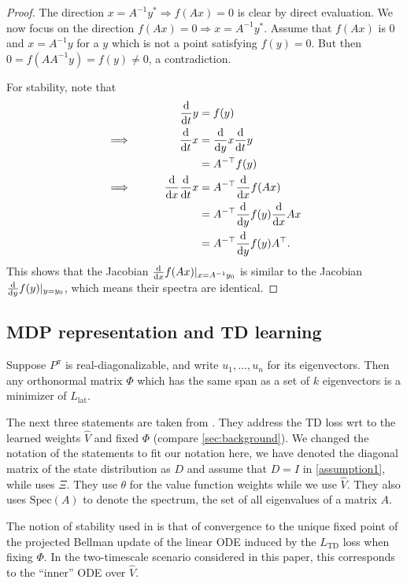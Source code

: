 \begin{proof}
The direction $x = A^{-1}y^* \Rightarrow f(Ax) = 0$ is clear by direct evaluation. We now focus on the direction $f(Ax) = 0 \Rightarrow x = A^{-1}y^*$. Assume that $f(Ax)$ is $0$ and $x = A^{-1}y$ for a $y$ which is not a point satisfying $f(y)=0$. But then $0 = f(AA^{-1}y) = f(y) \neq 0$, a contradiction.

For stability, note that
\begin{alignat*}{2}
    &\qquad&\frac{\mathrm{d}}{\mathrm{d} t} y & = f(y) \\
    \implies&&\frac{\mathrm{d}}{\mathrm{d} t} x & = \frac{\mathrm{d}}{\mathrm{d} y} x \frac{\mathrm{d}}{\mathrm{d} t} y\\
    && &= A^{-\top} f(y)\\
    \implies&& \frac{\mathrm{d}}{\mathrm{d} x} \frac{\mathrm{d}}{\mathrm{d} t} x &= A^{-\top} \frac{\mathrm{d}}{\mathrm{d} x} f(A x)\\
    && &= A^{-\top}  \frac{\mathrm{d}}{\mathrm{d} y} f(y) \frac{\mathrm{d}}{\mathrm{d} x} A x\\
    && &= A^{-\top}  \frac{\mathrm{d}}{\mathrm{d} y} f(y) A^\top.
\end{alignat*}
This shows that the Jacobian $\frac{\mathrm{d}}{\mathrm{d} x} f(Ax)|_{x=A^{-1}y_0}$ is similar to the Jacobian $\frac{\mathrm{d}}{\mathrm{d} y} f(y)|_{y=y_0}$, which means their spectra are identical.
\end{proof}


\subsection{MDP representation and TD learning}

\begin{lemma}\label{prop:TangResult2}
    Suppose $P^\pi$ is real-diagonalizable, and write $u_1,\dots, u_n$ for its eigenvectors. Then any orthonormal matrix $\Phi$ which has the same span as a set of $k$ eigenvectors is a minimizer of $L_{\text{lat}}$.
\end{lemma}


The next three statements are taken from \cite{ghosh2020representations}.  They address the TD loss wrt to the learned weights $\hat{V}$ and fixed $\Phi$ (compare \autoref{sec:background}).
We changed the notation of the statements to fit our notation here, we have denoted the diagonal matrix of the state distribution as $D$ and assume that $D=I$ in \autoref{assumption1}, while \cite{ghosh2020representations} uses $\Xi$. They use $\theta$ for the value function weights while we use $\hat{V}$.
They also uses $\text{Spec}(A)$ to denote the spectrum, the set of all eigenvalues of a matrix $A$.

The notion of stability used in \cite{ghosh2020representations} is that of convergence to the unique fixed point of the projected Bellman update of the linear ODE induced by the $L_\text{TD}$ loss when fixing $\Phi$. In the two-timescale scenario considered in this paper, this corresponds to the ``inner'' ODE over $\hat{V}$.

